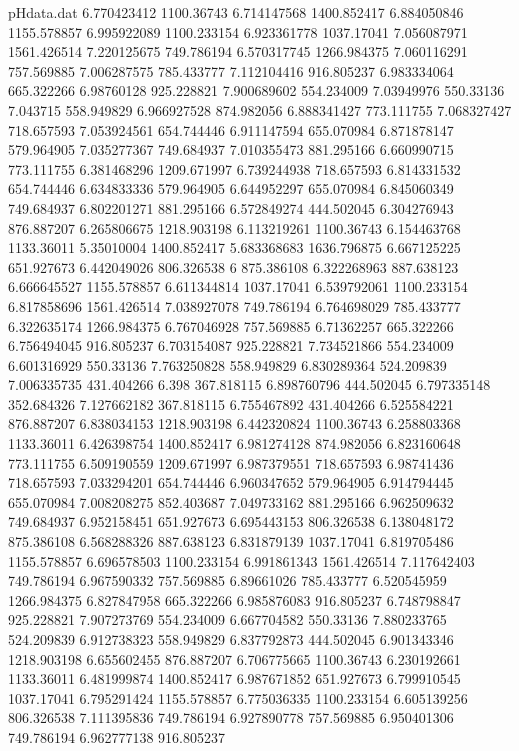 \begin{filecontents}{pHdata.dat}
6.770423412	1100.36743
6.714147568	1400.852417
6.884050846	1155.578857
6.995922089	1100.233154
6.923361778	1037.17041
7.056087971	1561.426514
7.220125675	749.786194
6.570317745	1266.984375
7.060116291	757.569885
7.006287575	785.433777
7.112104416	916.805237
6.983334064	665.322266
6.98760128	925.228821
7.900689602	554.234009
7.03949976	550.33136
7.043715	558.949829
6.966927528	874.982056
6.888341427	773.111755
7.068327427	718.657593
7.053924561	654.744446
6.911147594	655.070984
6.871878147	579.964905
7.035277367	749.684937
7.010355473	881.295166
6.660990715	773.111755
6.381468296	1209.671997
6.739244938	718.657593
6.814331532	654.744446
6.634833336	579.964905
6.644952297	655.070984
6.845060349	749.684937
6.802201271	881.295166
6.572849274	444.502045
6.304276943	876.887207
6.265806675	1218.903198
6.113219261	1100.36743
6.154463768	1133.36011
5.35010004	1400.852417
5.683368683	1636.796875
6.667125225	651.927673
6.442049026	806.326538
6	875.386108
6.322268963	887.638123
6.666645527	1155.578857
6.611344814	1037.17041
6.539792061	1100.233154
6.817858696	1561.426514
7.038927078	749.786194
6.764698029	785.433777
6.322635174	1266.984375
6.767046928	757.569885
6.71362257	665.322266
6.756494045	916.805237
6.703154087	925.228821
7.734521866	554.234009
6.601316929	550.33136
7.763250828	558.949829
6.830289364	524.209839
7.006335735	431.404266
6.398	367.818115
6.898760796	444.502045
6.797335148	352.684326
7.127662182	367.818115
6.755467892	431.404266
6.525584221	876.887207
6.838034153	1218.903198
6.442320824	1100.36743
6.258803368	1133.36011
6.426398754	1400.852417
6.981274128	874.982056
6.823160648	773.111755
6.509190559	1209.671997
6.987379551	718.657593
6.98741436	718.657593
7.033294201	654.744446
6.960347652	579.964905
6.914794445	655.070984
7.008208275	852.403687
7.049733162	881.295166
6.962509632	749.684937
6.952158451	651.927673
6.695443153	806.326538
6.138048172	875.386108
6.568288326	887.638123
6.831879139	1037.17041
6.819705486	1155.578857
6.696578503	1100.233154
6.991861343	1561.426514
7.117642403	749.786194
6.967590332	757.569885
6.89661026	785.433777
6.520545959	1266.984375
6.827847958	665.322266
6.985876083	916.805237
6.748798847	925.228821
7.907273769	554.234009
6.667704582	550.33136
7.880233765	524.209839
6.912738323	558.949829
6.837792873	444.502045
6.901343346	1218.903198
6.655602455	876.887207
6.706775665	1100.36743
6.230192661	1133.36011
6.481999874	1400.852417
6.987671852	651.927673
6.799910545	1037.17041
6.795291424	1155.578857
6.775036335	1100.233154
6.605139256	806.326538
7.111395836	749.786194
6.927890778	757.569885
6.950401306	749.786194
6.962777138	916.805237

\end{filecontents}
